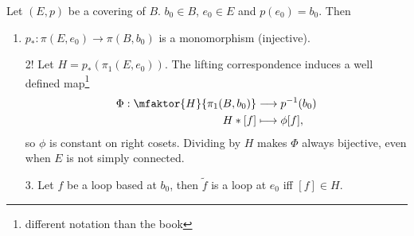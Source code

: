 \begin{lemma}[54.6]
    Let $(E, p)$ be a covering of $B$. $b_0 \in B$, $e_0 \in E$ and $p(e_0) = b_0$. Then
    \begin{enumerate}
        \item $p_*: \pi(E, e_0) \to  \pi(B, b_0)$ is a monomorphism (injective).
            
        \item[2!] Let $H = p_*(\pi_1(E, e_0))$. The lifting correspondence induces a well defined map\footnote{different notation than the book}
            \begin{align*}
                \Phi: \mfaktor{H}{\pi_1(B, b_0)} &\longrightarrow  p ^{-1}(b_0) \\
                H * [f]& \longmapsto \phi[f]
            ,\end{align*}
            so $\phi$ is constant on right cosets.
            Dividing by $H$ makes $\Phi$ always bijective, even when $E$ is not simply connected.
        \item[3.] Let $f$ be a loop based at $b_0$, then $\tilde f$ is a loop at $e_0$ iff $[f] \in H$.
    \end{enumerate}
\end{lemma}
